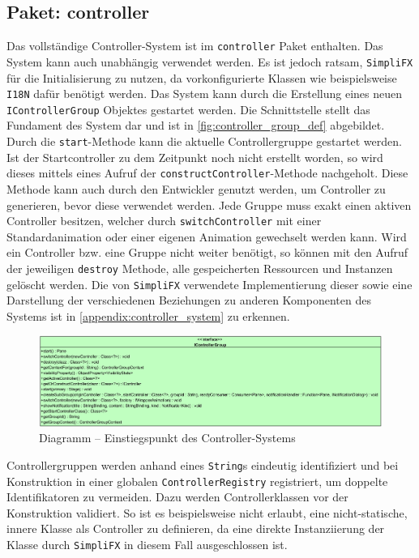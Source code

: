 \subsection{Paket: controller}
Das vollständige Controller-System ist im \texttt{controller} Paket enthalten. Das System kann auch unabhängig verwendet werden. Es ist jedoch ratsam, \texttt{SimpliFX} für die Initialisierung zu nutzen, da vorkonfigurierte Klassen wie beispielsweise \texttt{I18N} dafür benötigt werden. Das System kann durch die Erstellung eines neuen \texttt{IControllerGroup} Objektes gestartet werden. Die Schnittstelle stellt das Fundament des System dar und ist in \autoref{fig:controller_group_def} abgebildet. Durch die \texttt{start}-Methode kann die aktuelle Controllergruppe gestartet werden. Ist der Startcontroller zu dem Zeitpunkt noch nicht erstellt worden, so wird dieses mittels eines Aufruf der \texttt{constructController}-Methode nachgeholt. Diese Methode kann auch durch den Entwickler genutzt werden, um Controller zu generieren, bevor diese verwendet werden. Jede Gruppe muss exakt einen aktiven Controller besitzen, welcher durch \texttt{switchController} mit einer Standardanimation oder einer eigenen Animation gewechselt werden kann. Wird ein Controller bzw. eine Gruppe nicht weiter benötigt, so können mit den Aufruf der jeweiligen \texttt{destroy} Methode, alle gespeicherten Ressourcen und Instanzen gelöscht werden. Die von \texttt{SimpliFX} verwendete Implementierung dieser sowie eine Darstellung der verschiedenen Beziehungen zu anderen Komponenten des Systems ist in \autoref{appendix:controller_system} zu erkennen.
\begin{figure}[H]
	\centering
	\includegraphics[width=\textwidth]{Abbildungen/Controller-System-Group.png}
	\caption{Diagramm -- Einstiegspunkt des Controller-Systems}
	\label{fig:controller_group_def}
\end{figure}
\noindent Controllergruppen werden anhand eines \texttt{String}s eindeutig identifiziert und bei Konstruktion in einer globalen \texttt{ControllerRegistry} registriert, um doppelte Identifikatoren zu vermeiden. Dazu werden Controllerklassen vor der Konstruktion validiert. So ist es beispielsweise nicht erlaubt, eine nicht-statische, innere Klasse als Controller zu
 definieren, da eine direkte Instanziierung der Klasse durch \texttt{SimpliFX} in diesem Fall ausgeschlossen ist.
